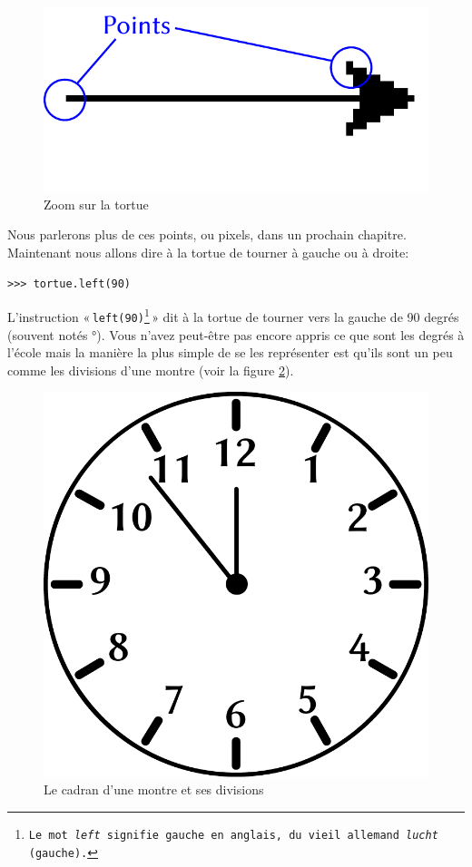 \begin{figure}[!ht]
\centering
\includegraphics[scale=1]{images/points.pdf}
\caption{Zoom sur la tortue}
\label{fig:points}
\end{figure}

Nous parlerons plus de ces points, ou pixels, dans un prochain chapitre.
Maintenant nous allons dire à la tortue de tourner à gauche ou à droite:

\begin{Verbatim}[frame=single,rulecolor=\color{mbleu}, label=à taper]
>>> tortue.left(90)
\end{Verbatim}

L'instruction « \texttt{left(90)\footnote{Le mot \emph{left} signifie gauche en anglais, du vieil allemand \emph{lucht} (gauche).}} »  dit à la tortue de tourner vers la gauche de 90 degrés (souvent notés °). Vous n'avez peut-être pas encore appris ce que sont les degrés à l'école mais la manière la plus simple de se les représenter est qu'ils sont un peu comme les divisions d'une montre (voir la figure \ref{fig:clock}).
\begin{figure}[H]
\centering
\includegraphics[scale=0.5]{images/clock.pdf}
\caption{Le cadran d'une montre et ses divisions}
\label{fig:clock}
\end{figure}

